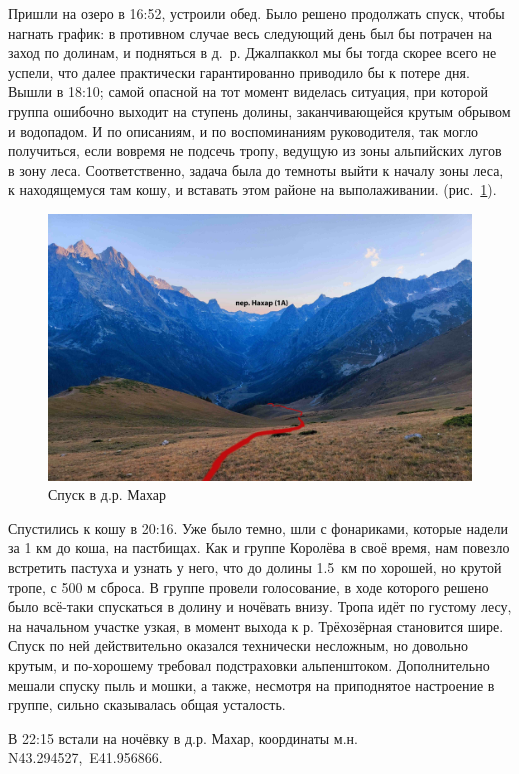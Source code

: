 Пришли на озеро в 16:52, устроили обед. Было решено продолжать спуск, чтобы нагнать график: в противном случае весь следующий день был бы потрачен на заход по долинам, и подняться в д.~р. Джалпаккол мы бы тогда скорее всего не успели, что далее практически гарантированно приводило бы к потере дня. Вышли в 18:10; самой опасной на тот момент виделась ситуация, при которой группа ошибочно выходит на ступень долины, заканчивающейся крутым обрывом и водопадом. И по описаниям, и по воспоминаниям руководителя, так могло получиться, если вовремя не подсечь тропу, ведущую из зоны альпийских лугов в зону леса. Соответственно, задача была до темноты выйти к началу зоны леса, к находящемуся там кошу, и вставать этом районе на выполаживании.  (рис.~\ref{fig:IMG_20240820_184645.jpg}).
\begin{figure}[h!]
	\centering
	\includegraphics[width=0.7\linewidth]{../pics/IMG_20240820_184645.jpg}
	\caption{Спуск в д.р. Махар}
	\label{fig:IMG_20240820_184645.jpg}
\end{figure}

Спустились к кошу в 20:16. Уже было темно, шли с фонариками, которые надели за 1 км до коша, на пастбищах. Как и группе Королёва в своё время, нам повезло встретить пастуха и узнать у него, что до долины 1.5~км по хорошей, но крутой тропе, с 500 м сброса. В группе провели голосование, в ходе которого решено было всё-таки спускаться в долину и ночёвать внизу. Тропа идёт по густому лесу, на начальном участке узкая, в момент выхода к р. Трёхозёрная становится шире. Спуск по ней действительно оказался технически несложным, но довольно крутым, и по-хорошему требовал подстраховки альпенштоком. Дополнительно мешали спуску пыль и мошки, а также, несмотря на приподнятое настроение в группе, сильно сказывалась общая усталость.

В 22:15 встали на ночёвку в д.р. Махар, координаты м.н. N43.294527\degree,~E41.956866\degree.

\clearpage 

